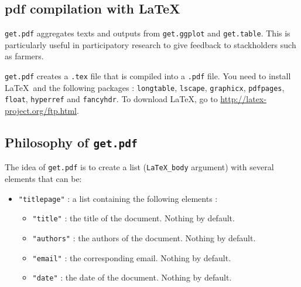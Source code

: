 \documentclass{article}\usepackage[]{graphicx}\usepackage[]{color}
\renewcommand{\sl}{seed-lots}
\begin{document}
\begin{itemize}





\newpage


\section{pdf compilation with \LaTeX}
\label{pdf}

\texttt{get.pdf} aggregates texts and outputs from \texttt{get.ggplot} and \texttt{get.table}.
This is particularly useful in participatory research to give feedback to stackholders such as farmers.

\texttt{get.pdf} creates a \texttt{.tex} file that is compiled into a \texttt{.pdf} file.
You need to install \LaTeX~and the following packages : \texttt{longtable}, \texttt{lscape}, \texttt{graphicx}, \texttt{pdfpages}, \texttt{float}, \texttt{hyperref} and \texttt{fancyhdr}. 
To download LaTeX, go to \url{http://latex-project.org/ftp.html}.


\subsection{Philosophy of \texttt{get.pdf} }

The idea of \texttt{get.pdf} is to create a list (\texttt{LaTeX\_body} argument) with several elements that can be:

\begin{itemize}
\item \texttt{"titlepage"} : a list containing the following elements :
	\begin{itemize}
	\item \texttt{"title"} : the title of the document. Nothing by default.
	\item \texttt{"authors"} : the authors of the document. Nothing by default.
	\item \texttt{"email"} : the corresponding email. Nothing by default.
	\item \texttt{"date"} : the date of the document. Nothing by default.
	\end{itemize}


\end{itemize}
\end{itemize}
\end{document}
